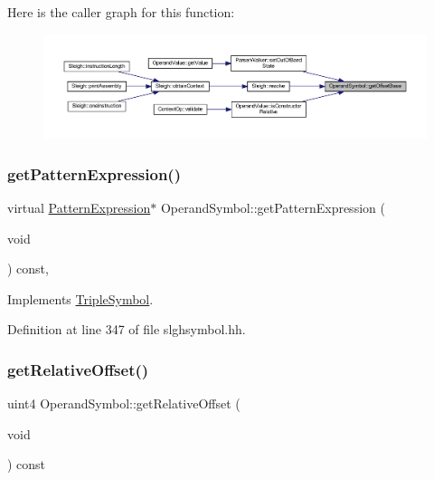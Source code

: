 Here is the caller graph for this function\+:
\nopagebreak
\begin{figure}[H]
\begin{center}
\leavevmode
\includegraphics[width=350pt]{class_operand_symbol_ae4852740136d240df30da3fb8154e1fa_icgraph}
\end{center}
\end{figure}
\mbox{\label{class_operand_symbol_aaebd25df34fa9100b22e3df9272d2910}} 
\subsubsection{\texorpdfstring{getPatternExpression()}{getPatternExpression()}}
{\footnotesize\ttfamily virtual \mbox{\hyperlink{class_pattern_expression}{Pattern\+Expression}}$\ast$ Operand\+Symbol\+::get\+Pattern\+Expression (\begin{DoxyParamCaption}\item[{void}]{ }\end{DoxyParamCaption}) const\hspace{0.3cm}{\ttfamily [inline]}, {\ttfamily [virtual]}}



Implements \mbox{\hyperlink{class_triple_symbol_a213895658c5fe547edf9ac54a1d2de2e}{Triple\+Symbol}}.



Definition at line 347 of file slghsymbol.\+hh.

\mbox{\label{class_operand_symbol_a172e311e45795d49ee679fac4a35faad}} 
\subsubsection{\texorpdfstring{getRelativeOffset()}{getRelativeOffset()}}
{\footnotesize\ttfamily uint4 Operand\+Symbol\+::get\+Relative\+Offset (\begin{DoxyParamCaption}\item[{void}]{ }\end{DoxyParamCaption}) const\hspace{0.3cm}{\ttfamily [inline]}}



